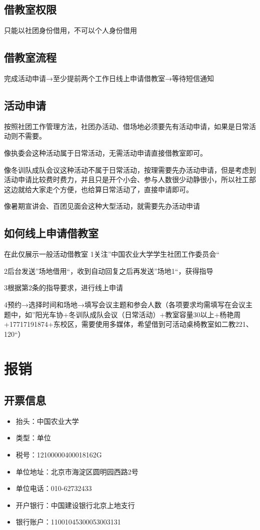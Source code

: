 \documentclass{ctexbook}
\begin{document}
\subsection{借教室权限}
只能以社团身份借用，不可以个人身份借用
\subsection{借教室流程}
完成活动申请→至少提前两个工作日线上申请借教室→等待短信通知
\subsection{活动申请}
按照社团工作管理方法，社团办活动、借场地必须要先有活动申请，如果是日常活动则不需要。

像执委会这种活动属于日常活动，无需活动申请直接借教室即可。

像冬训队成队会议这种活动不属于日常活动，按理需要先办活动申请，但是考虑到活动申请比较费时费力，并且只是开个小会、参与人数很少动静很小，所以社工部这边就给大家走个方便，也给算日常活动了，直接申请即可。

像暑期宣讲会、百团见面会这种大型活动，就需要先办活动申请
\subsection{如何线上申请借教室}
在此仅展示一般活动借教室
1关注''中国农业大学学生社团工作委员会``

2后台发送''场地借用``，收到自动回复之后再发送''场地1``，获得指导

3根据第2条的指导要求，进行线上申请

4预约→选择时间和场地→填写会议主题和参会人数（各项要求均需填写在会议主题中，如''阳光车协+冬训队成队会议（日常活动）+教室容量30以上+杨艳周+17717191874+东校区，需要使用多媒体，希望借到可活动桌椅教室如二教221、120``）

\section{报销}
\subsection{开票信息}
\begin{itemize}
    \item 抬头：中国农业大学
    \item 类型：单位
    \item 税号：12100000400018162G
    \item 单位地址：北京市海淀区圆明园西路2号
    \item 单位电话：010-62732433
    \item 开户银行：中国建设银行北京上地支行
    \item 银行账户：11001045300053003131
\end{itemize}
\end{document}
